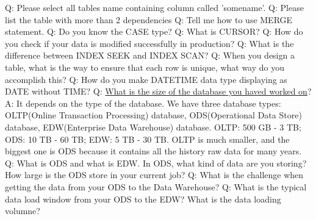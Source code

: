 \documentclass[a4paper,11pt]{article}
\begin{document}
\noindent 
Q: Please select all tables name containing column called 'somename'. \newline \newline
\noindent 
Q: Please list the table with more than 2 dependencies \newline \newline
\noindent 
Q: Tell me how to use MERGE statement. \newline \newline
\noindent 
Q: Do you know the CASE type? \newline \newline
\noindent 
Q: What is CURSOR? \newline \newline
\noindent 
Q: How do you check if your data is modified successfully in production? \newline \newline
\noindent 
Q: What is the difference between INDEX SEEK and INDEX SCAN? \newline \newline
\noindent 
Q: When you design a table, what is the way to ensure that each row is unique, what way do you accomplish this? \newline \newline
\noindent 
Q: How do you make DATETIME data type displaying as DATE without TIME? \newline \newline
\noindent 
Q: \ul{What is the size of the database you haved worked on}? \newline
A: It depends on the type of the database. We have three database types: OLTP(Online Transaction Processing) database, ODS(Operational Data Store) database, EDW(Enterprise Data Warehouse) database. OLTP: 500 GB - 3 TB; ODS: 10 TB - 60 TB; EDW: 5 TB - 30 TB. OLTP is much smaller, and the biggest one is ODS because it contains all the history raw data for many years.\newline \newline
\noindent 
Q: What is ODS and what is EDW. In ODS, what kind of data are you storing? How large is the ODS store in your current job?\newline \newline
\noindent 
Q: What is the challenge when getting the data from your ODS to the Data Warehouse?\newline \newline
\noindent 
Q: What is the typical data load window from your ODS to the EDW? What is the data loading volumne?\newline \newline
\end{document}
